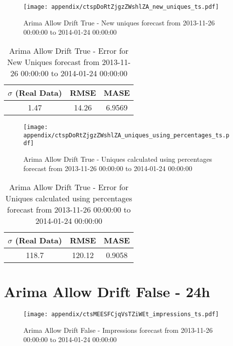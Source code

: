 \begin{figure}[H] \begin{center} \leavevmode
\texttt{[image: appendix/ctspDoRtZjgzZWshlZA\_new\_uniques\_ts.pdf]} \caption{
Arima Allow Drift True - New uniques forecast from 2013-11-26 00:00:00 to 2014-01-24 00:00:00} \label{fig:appendix/ctspDoRtZjgzZWshlZA_new_uniques_ts.pdf} \end{center}
\end{figure}

\begin{table}[H]
\centering
\footnotesize
\begin{tabular}{ccc}
$\sigma$ (Real Data) & RMSE & MASE   \\ \hline
1.47 & 14.26 & 6.9569 \\
\end{tabular}

\vspace{0.5cm}

\caption{
Arima Allow Drift True - Error for New Uniques forecast from 2013-11-26 00:00:00 to 2014-01-24 00:00:00}
\end{table}

\begin{figure}[H] \begin{center} \leavevmode
\texttt{[image: appendix/ctspDoRtZjgzZWshlZA\_uniques\_using\_percentages\_ts.pdf]} \caption{
Arima Allow Drift True - Uniques calculated using percentages forecast from 2013-11-26 00:00:00 to 2014-01-24 00:00:00} \label{fig:appendix/ctspDoRtZjgzZWshlZA_uniques_using_percentages_ts.pdf} \end{center}
\end{figure}

\begin{table}[H]
\centering
\footnotesize
\begin{tabular}{ccc}
$\sigma$ (Real Data) & RMSE & MASE   \\ \hline
118.7 & 120.12 & 0.9058 \\
\end{tabular}

\vspace{0.5cm}

\caption{
Arima Allow Drift True - Error for Uniques calculated using percentages forecast from 2013-11-26 00:00:00 to 2014-01-24 00:00:00}
\end{table}

\section{Arima Allow Drift False - 24h}
\begin{figure}[H] \begin{center} \leavevmode
\texttt{[image: appendix/ctsMEESFCjqVsTZiWEt\_impressions\_ts.pdf]} \caption{
Arima Allow Drift False - Impressions forecast from 2013-11-26 00:00:00 to 2014-01-24 00:00:00} \label{fig:appendix/ctsMEESFCjqVsTZiWEt_impressions_ts.pdf} \end{center}
\end{figure}

